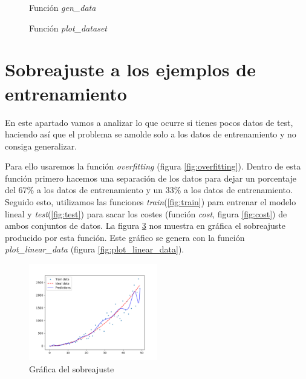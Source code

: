 \documentclass[6pt]{AiTex}
\begin{document}
\begin{figure}[H]
    \centering
    
    \caption{Función \textit{gen\_data}}
    \label{fig:gen_data}
\end{figure}

\begin{figure}[H]
    \centering
    
    \caption{Función \textit{plot\_dataset}}
    \label{fig:plot_dataset}
\end{figure}

\section{Sobreajuste a los ejemplos de entrenamiento}

En este apartado vamos a analizar lo que ocurre si tienes pocos datos de test, haciendo así que el problema se amolde solo a los datos de entrenamiento y no consiga generalizar.

Para ello usaremos la función \textit{overfitting} (figura \ref{fig:overfitting}). Dentro de esta función primero hacemos una separación de los datos para dejar un porcentaje del 67\% a los datos de entrenamiento y un 33\% a los datos de entrenamiento. Seguido esto, utilizamos las funciones \textit{train}(\ref{fig:train}) para entrenar el modelo lineal y \textit{test}(\ref{fig:test}) para sacar los costes (función \textit{cost}, figura \ref{fig:cost}) de ambos conjuntos de datos. La figura \ref{fig:overfitting_plot} nos muestra en gráfica el sobreajuste producido por esta función. Este gráfico se genera con la función \textit{plot\_linear\_data} (figura \ref{fig:plot_linear_data}).

\begin{figure}[H]
    \centering
    \includegraphics[width=0.5\textwidth]{./images/overfitting.png}
    \caption{Gráfica del sobreajuste}
    \label{fig:overfitting_plot}
\end{figure}
\end{document}
